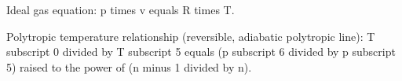 Ideal gas equation:  
p times v equals R times T.  

Polytropic temperature relationship (reversible, adiabatic polytropic line):  
T subscript 0 divided by T subscript 5 equals (p subscript 6 divided by p subscript 5) raised to the power of (n minus 1 divided by n).
